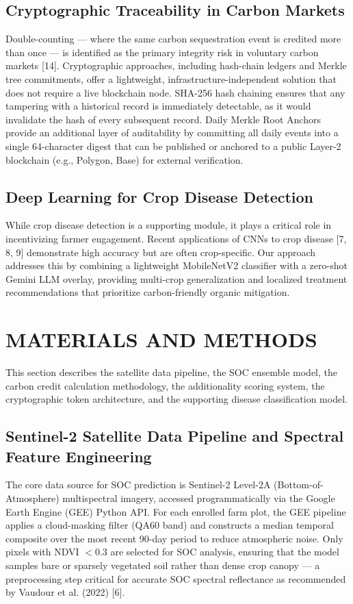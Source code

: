 \documentclass[10pt,a4paper]{article}
\begin{document}
\subsection{Cryptographic Traceability in Carbon Markets}
Double-counting — where the same carbon sequestration event is credited more than once — is identified as the primary integrity risk in voluntary carbon markets [14]. Cryptographic approaches, including hash-chain ledgers and Merkle tree commitments, offer a lightweight, infrastructure-independent solution that does not require a live blockchain node. SHA-256 hash chaining ensures that any tampering with a historical record is immediately detectable, as it would invalidate the hash of every subsequent record. Daily Merkle Root Anchors provide an additional layer of auditability by committing all daily events into a single 64-character digest that can be published or anchored to a public Layer-2 blockchain (e.g., Polygon, Base) for external verification.

\subsection{Deep Learning for Crop Disease Detection}
While crop disease detection is a supporting module, it plays a critical role in incentivizing farmer engagement. Recent applications of CNNs to crop disease [7, 8, 9] demonstrate high accuracy but are often crop-specific. Our approach addresses this by combining a lightweight MobileNetV2 classifier with a zero-shot Gemini LLM overlay, providing multi-crop generalization and localized treatment recommendations that prioritize carbon-friendly organic mitigation.

\section{MATERIALS AND METHODS}

This section describes the satellite data pipeline, the SOC ensemble model, the carbon credit calculation methodology, the additionality scoring system, the cryptographic token architecture, and the supporting disease classification model.

\subsection{Sentinel-2 Satellite Data Pipeline and Spectral Feature Engineering}
The core data source for SOC prediction is Sentinel-2 Level-2A (Bottom-of-Atmosphere) multispectral imagery, accessed programmatically via the Google Earth Engine (GEE) Python API. For each enrolled farm plot, the GEE pipeline applies a cloud-masking filter (QA60 band) and constructs a median temporal composite over the most recent 90-day period to reduce atmospheric noise. Only pixels with NDVI $< 0.3$ are selected for SOC analysis, ensuring that the model samples bare or sparsely vegetated soil rather than dense crop canopy — a preprocessing step critical for accurate SOC spectral reflectance as recommended by Vaudour et al. (2022) [6].
\end{document}
